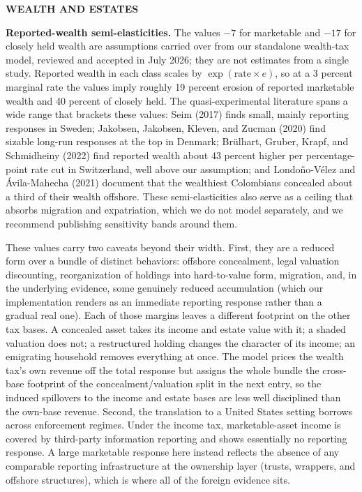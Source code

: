 \documentclass[10pt,twocolumn]{article}
\begin{document}
\medskip\noindent\textbf{\small WEALTH AND ESTATES}

\textbf{Reported-wealth semi-elasticities.} The values $-7$ for marketable and
$-17$ for closely held wealth are assumptions carried over from our standalone
wealth-tax model, reviewed and accepted in July 2026; they are not estimates
from a single study. Reported wealth in each class scales by
$\exp(\text{rate} \times e)$, so at a 3 percent marginal rate the values imply
roughly 19 percent erosion of reported marketable wealth and 40 percent of
closely held. The quasi-experimental literature spans a wide range that
brackets these values: Seim (2017) finds small, mainly reporting responses in
Sweden; Jakobsen, Jakobsen, Kleven, and Zucman (2020) find sizable long-run
responses at the top in Denmark; Br\"ulhart, Gruber, Krapf, and Schmidheiny
(2022) find reported wealth about 43 percent higher per percentage-point rate
cut in Switzerland, well above our assumption; and Londo\~no-V\'elez and
\'Avila-Mahecha (2021) document that the wealthiest Colombians concealed about
a third of their wealth offshore. These semi-elasticities also serve as a
ceiling that absorbs migration and expatriation, which we do not model
separately, and we recommend publishing sensitivity bands around them.

These values carry two caveats beyond their width. First, they are a reduced
form over a bundle of distinct behaviors: offshore concealment, legal
valuation discounting, reorganization of holdings into hard-to-value form,
migration, and, in the underlying evidence, some genuinely reduced
accumulation (which our implementation renders as an immediate reporting
response rather than a gradual real one). Each of those margins leaves a
different footprint on the other tax bases. A concealed asset takes its income
and estate value with it; a shaded valuation does not; a restructured holding
changes the character of its income; an emigrating household removes
everything at once. The model prices the wealth tax's own revenue off the
total response but assigns the whole bundle the cross-base footprint of the
concealment/valuation split in the next entry, so the induced spillovers to
the income and estate bases are less well disciplined than the own-base
revenue. Second, the translation to a United States setting borrows across
enforcement regimes. Under the income tax, marketable-asset income is covered
by third-party information reporting and shows essentially no reporting
response. A large marketable response here instead reflects the absence of any
comparable reporting infrastructure at the ownership layer (trusts, wrappers,
and offshore structures), which is where all of the foreign evidence sits.
\end{document}
